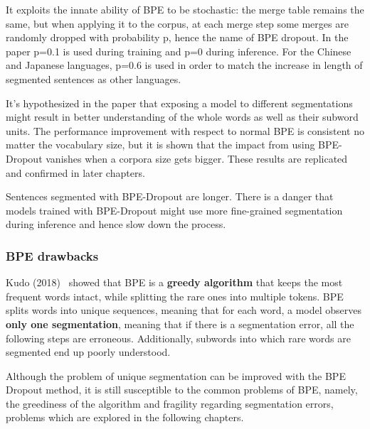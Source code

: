 It exploits the innate ability of BPE to be stochastic: the merge table remains the same, but when applying it to the corpus, at each merge step some merges are randomly dropped with probability p, hence the name of BPE dropout. In the paper p=0.1 is used during training and p=0 during inference. For the Chinese and Japanese languages, p=0.6 is used in order to match the increase in length of segmented sentences as other languages.

It's hypothesized in the paper that exposing a model to different segmentations might result in better understanding of the whole words as well as their subword units. The performance improvement with respect to normal BPE is consistent no matter the vocabulary size, but it is shown that the impact from using BPE-Dropout vanishes when a corpora size gets bigger. These results are replicated and confirmed in later chapters.

Sentences segmented with BPE-Dropout are longer. There is a danger that models trained with BPE-Dropout might use more fine-grained segmentation during inference and hence slow down the process.

\subsubsection{BPE drawbacks}

Kudo (2018)~\cite{kudo-2018-subword} showed that BPE is a \textbf{greedy algorithm} that keeps the most frequent words intact, while splitting the rare ones into multiple tokens. BPE splits words into unique sequences, meaning that for each word, a model observes \textbf{only one segmentation}, meaning that if there is a segmentation error, all the following steps are erroneous. Additionally, subwords into which rare words are segmented end up poorly understood.

Although the problem of unique segmentation can be improved with the BPE Dropout method, it is still susceptible to the common problems of BPE, namely, the greediness of the algorithm and fragility regarding segmentation errors, problems which are explored in the following chapters.

